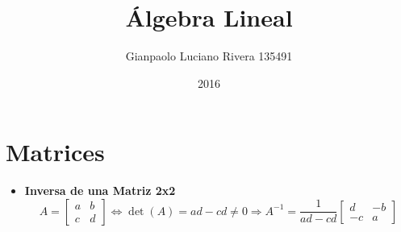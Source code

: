 \documentclass[pdftex,11pt,a4paper]{article}
\title{Álgebra Lineal}
\author{Gianpaolo Luciano Rivera 135491}
\date{2016}
\begin{document}
\maketitle

\section{Matrices}
\begin{itemize}
	\item \textbf{Inversa de una Matriz 2x2}
	$$A = \begin{bmatrix}
	a&b\\c&d
	\end{bmatrix}
	\iff \det(A) = ad -cd \neq 0 \Rightarrow A^{-1} = \dfrac{1}{ad-cd}				\begin{bmatrix}
	d & -b \\
	-c & a
	\end{bmatrix}$$
\end{itemize}
\end{document}
